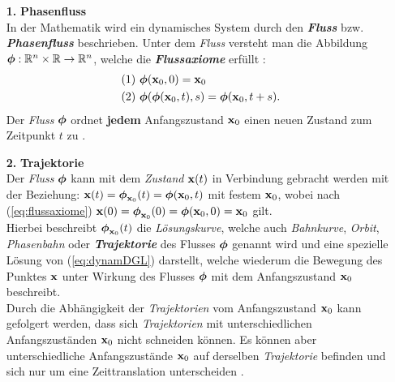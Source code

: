 \begin{itemize}
    \item[\textbf{1.}]\textbf{Phasenfluss}\\
    In der Mathematik wird ein dynamisches System durch den \textit{\textbf{Fluss}} bzw. \textit{\textbf{Phasenfluss}}  beschrieben. Unter dem \textit{Fluss} versteht man die Abbildung $\boldsymbol{\mathbf{\boldsymbol{\mathbf{\phi}}}}:\mathbb{R}^n\times\mathbb{R}\rightarrow\mathbb{R}^n$, welche die \textit{\textbf{Flussaxiome}} erfüllt \citep{Mat1}:
    \begin{gather}
        \begin{aligned}
            (1)~&\boldsymbol{\mathbf{\boldsymbol{\mathbf{\phi}}}}(\boldsymbol{\mathbf{x}}_0,0)=\boldsymbol{\mathbf{x}}_0\\
            (2)~&\boldsymbol{\mathbf{\boldsymbol{\mathbf{\phi}}}}(\boldsymbol{\mathbf{\phi}}(\boldsymbol{\mathbf{x}}_0,t),s)=\boldsymbol{\mathbf{\phi}}(\boldsymbol{\mathbf{x}}_0,t+s).
            \label{eq:flussaxiome}
        \end{aligned}
    \end{gather}
    Der \textit{Fluss} $\boldsymbol{\mathbf{\phi}}$ ordnet \textbf{jedem} Anfangszustand $\boldsymbol{\mathbf{x}}_0$ einen neuen Zustand zum Zeitpunkt $t$ zu \citep{Lueck}.\\

    \item[\textbf{2.}]\textbf{Trajektorie}\\
    Der \textit{Fluss} $\boldsymbol{\mathbf{\phi}}$ kann mit dem \textit{Zustand} $\boldsymbol{\mathbf{x}}(t)$ in Verbindung gebracht werden mit der Beziehung: $\boldsymbol{\mathbf{x}}(t)=\boldsymbol{\mathbf{\phi}}_{\boldsymbol{\mathbf{x}}_0}(t)=\boldsymbol{\mathbf{\phi}}(\boldsymbol{\mathbf{x}}_0,t)$ mit festem $\boldsymbol{\mathbf{x}}_0$, wobei nach  (\ref{eq:flussaxiome}) $\boldsymbol{\mathbf{x}}(0)=\boldsymbol{\mathbf{\phi}}_{\boldsymbol{\mathbf{x}}_0}(0)=\boldsymbol{\mathbf{\phi}}(\boldsymbol{\mathbf{x}}_0,0)=\boldsymbol{\mathbf{x}}_0$ gilt.\\
    Hierbei beschreibt $\boldsymbol{\mathbf{\phi}}_{\boldsymbol{\mathbf{x}}_0}(t)$ die \textit{Lösungskurve}, welche auch \textit{Bahnkurve}, \textit{Orbit}, \textit{Phasenbahn} oder \textit{\textbf{Trajektorie}} des Flusses $\boldsymbol{\mathbf{\phi}}$ genannt wird und eine spezielle Lösung von (\ref{eq:dynamDGL}) darstellt, welche wiederum die Bewegung des Punktes $\boldsymbol{\mathbf{x}}$ unter Wirkung des Flusses $\boldsymbol{\mathbf{\phi}}$ mit dem Anfangszustand $\boldsymbol{\mathbf{x}}_0$ beschreibt. \citep{Lueck}\\
    Durch die Abhängigkeit der \textit{Trajektorien} vom Anfangszustand $\boldsymbol{\mathbf{x}}_0$ kann gefolgert werden, dass sich \textit{Trajektorien} mit unterschiedlichen Anfangszuständen $\boldsymbol{\mathbf{x}}_0$ nicht schneiden können. Es können aber unterschiedliche Anfangszustände $\boldsymbol{\mathbf{x}}_0$ auf derselben \textit{Trajektorie} befinden und sich nur um eine Zeittranslation unterscheiden \citep{Mat1}.\\


\end{itemize}
